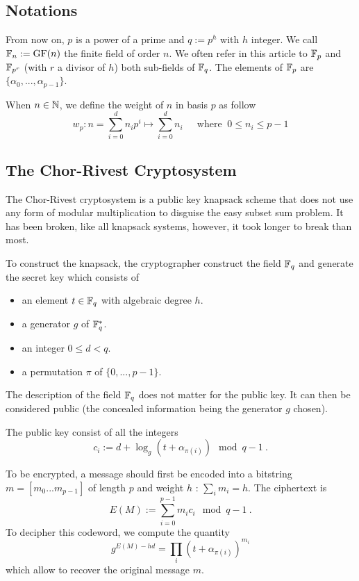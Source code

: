 \documentclass[a4paper]{article}
\newcommand{\GF}[1]{\F_{#1}}
\begin{document}
\subsection{Notations}

From now on, $p$ is a power of a prime and $q := p^h$ with $h$ integer. We call $\mathbb{F}_n := \text{GF}(n)$ the finite field of order $n$. We often refer in this article to $\mathbb{F}_p$ and $\mathbb{F}_{p^r}$ (with $r$ a divisor of $h$) both sub-fields of $\mathbb{F}_q$. The elements of $\mathbb{F}_p$ are $\{ \alpha_0, ... , \alpha_{p-1} \}$.

When $n \in \mathbb{N}$, we define the weight of $n$ in basis $p$ as follow
$$ w_p : n = \sum_{i=0}^{d} n_i p^i \longmapsto \sum_{i=0}^{d} n_i \ \ \ \ \ \text{ where }  \ 0 \leq n_i \leq p-1 $$

\subsection{The Chor-Rivest Cryptosystem}

The Chor-Rivest cryptosystem is a public key knapsack scheme that does not use any form of modular multiplication to disguise the easy subset sum problem. It has been broken, like all knapsack systems, however, it took longer to break than most.

To construct the knapsack, the cryptographer construct the field $\mathbb{F}_q$ and generate the secret key which consists of
\begin{itemize}
\item an element $t \in \GF{q}$ with algebraic degree $h$.
\item a generator $g$ of $\GF{q}^{*}$.
\item an integer $0 \leq d < q$.
\item a permutation $\pi$ of $\{ 0, ... , p-1 \}$.
\end{itemize}
The description of the field $\mathbb{F}_q$ does not matter for the public key. It can then be considered public (the concealed information being the generator $g$ chosen).

The public key consist of all the integers
$$ c_i := d + \log_g(t + \alpha_{\pi(i)}) \mod q-1 \ .$$

To be encrypted, a message should first be encoded into a bitstring $m = [m_0...m_{p-1}]$ of length $p$ and weight $h$ : $\sum_i m_i = h$. The ciphertext is
$$ E(M) := \sum_{i=0}^{p-1} m_i c_i \mod q-1 \ .$$
To decipher this codeword, we compute the quantity
$$ g^{E(M) - hd} =  \prod_i \left( t + \alpha_{\pi(i)}\right)^{m_i} $$
which allow to recover the original message $m$.
\end{document}
